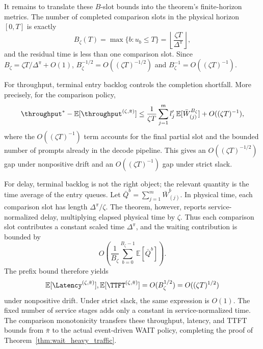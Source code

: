 It remains to translate these \(B\)-slot bounds into the theorem's finite-horizon metrics. The number of completed comparison slots in the physical horizon \([0,T]\) is exactly
\[
    B_\zeta(T)=\max\{b:u_b\le T\}
    =\left\lfloor\frac{\zeta T}{\Delta^\pi}\right\rfloor,
\]
and the residual time is less than one comparison slot. Since \(B_\zeta=\zeta T/\Delta^\pi+O(1)\), \(B_\zeta^{-1/2}=O((\zeta T)^{-1/2})\) and \(B_\zeta^{-1}=O((\zeta T)^{-1})\).

For throughput, terminal entry backlog controls the completion shortfall. More precisely, for the comparison policy,
\[
    \throughput^*-\mathbb{E}[\throughput^{(\zeta,\bar\pi)}]
    \le
    \frac{1}{\zeta T}\sum_{j=1}^m l_j^\prime\,
    \mathbb{E}[\bar W^{B_\zeta}_{(j)}]
    +O((\zeta T)^{-1}),
\]
where the \(O((\zeta T)^{-1})\) term accounts for the final partial slot and the bounded number of prompts already in the decode pipeline. This gives an \(O((\zeta T)^{-1/2})\) gap under nonpositive drift and an \(O((\zeta T)^{-1})\) gap under strict slack.

For delay, terminal backlog is not the right object; the relevant quantity is the time average of the entry queues. Let \(\bar Q^b=\sum_{j=1}^m \bar W^b_{(j)}\). In physical time, each comparison slot has length \(\Delta^\pi/\zeta\). The theorem, however, reports service-normalized delay, multiplying elapsed physical time by \(\zeta\). Thus each comparison slot contributes a constant scaled time \(\Delta^\pi\), and the waiting contribution is bounded by
\[
    O\!\left(
    \frac{1}{B_\zeta}\sum_{b=0}^{B_\zeta-1}
    \mathbb{E}[\bar Q^b]
    \right).
\]
The prefix bound therefore yields
\[
    \mathbb{E}[\Latency^{(\zeta,\bar\pi)}],
    \mathbb{E}[\TTFT^{(\zeta,\bar\pi)}]
    =
    O(B_\zeta^{1/2})
    =
    O((\zeta T)^{1/2})
\]
under nonpositive drift. Under strict slack, the same expression is \(O(1)\). The fixed number of service stages adds only a constant in service-normalized time. The comparison monotonicity transfers these throughput, latency, and TTFT bounds from \(\bar\pi\) to the actual event-driven WAIT policy, completing the proof of Theorem~\ref{thm:wait_heavy_traffic}.
